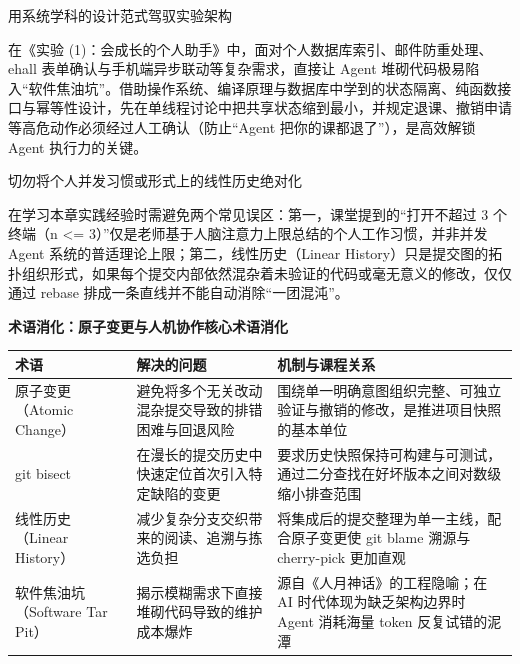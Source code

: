 \documentclass[UTF8,a4paper,11pt,fontset=fandol]{ctexart}
\begin{document}
\begin{knowledgebox}{用系统学科的设计范式驾驭实验架构}

在《实验 (1)：会成长的个人助手》中，面对个人数据库索引、邮件防重处理、ehall 表单确认与手机端异步联动等复杂需求，直接让 Agent 堆砌代码极易陷入“软件焦油坑”。借助操作系统、编译原理与数据库中学到的状态隔离、纯函数接口与幂等性设计，先在单线程讨论中把共享状态缩到最小，并规定退课、撤销申请等高危动作必须经过人工确认（防止“Agent 把你的课都退了”），是高效解锁 Agent 执行力的关键。

\end{knowledgebox}

\begin{warningbox}{切勿将个人并发习惯或形式上的线性历史绝对化}

在学习本章实践经验时需避免两个常见误区：第一，课堂提到的“打开不超过 3 个终端（n <= 3）”仅是老师基于人脑注意力上限总结的个人工作习惯，并非并发 Agent 系统的普适理论上限；第二，线性历史（Linear History）只是提交图的拓扑组织形式，如果每个提交内部依然混杂着未验证的代码或毫无意义的修改，仅仅通过 rebase 排成一条直线并不能自动消除“一团混沌”。

\end{warningbox}

\par{}\textbf{术语消化：原子变更与人机协作核心术语消化}

\begin{center}\small\begin{tabularx}{\linewidth}{YYY}

\toprule

术语 & 解决的问题 & 机制与课程关系\\\midrule

原子变更（Atomic Change） & 避免将多个无关改动混杂提交导致的排错困难与回退风险 & 围绕单一明确意图组织完整、可独立验证与撤销的修改，是推进项目快照的基本单位\\[3pt]

git bisect & 在漫长的提交历史中快速定位首次引入特定缺陷的变更 & 要求历史快照保持可构建与可测试，通过二分查找在好坏版本之间对数级缩小排查范围\\[3pt]

线性历史（Linear History） & 减少复杂分支交织带来的阅读、追溯与拣选负担 & 将集成后的提交整理为单一主线，配合原子变更使 git blame 溯源与 cherry-pick 更加直观\\[3pt]

软件焦油坑（Software Tar Pit） & 揭示模糊需求下直接堆砌代码导致的维护成本爆炸 & 源自《人月神话》的工程隐喻；在 AI 时代体现为缺乏架构边界时 Agent 消耗海量 token 反复试错的泥潭\\[3pt]

\bottomrule\end{tabularx}\end{center}
\end{document}
